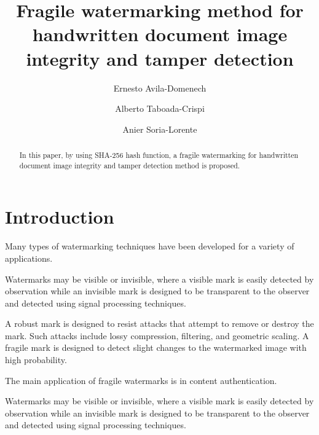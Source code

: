 \documentclass[runningheads]{llncs}
\begin{document}
%
\title{Fragile watermarking method for handwritten document image integrity and tamper detection}
%
%
\author{Ernesto Avila-Domenech \and
Alberto Taboada-Crispi \and
Anier Soria-Lorente}
%
%
%
\maketitle              %
%
\begin{abstract}
In this paper, by using SHA-256 hash function, a fragile watermarking for handwritten document image integrity and tamper detection method is proposed.

\end{abstract}
%
%
%
\section{Introduction}
Many types of watermarking techniques have been developed for a variety of applications.

Watermarks may be visible or invisible, where a visible mark is easily detected by observation while an invisible mark is designed to be transparent to the observer and detected using signal processing techniques.

A robust mark is designed to resist attacks that attempt to remove or destroy the mark. Such attacks include
lossy compression, filtering, and geometric scaling. A fragile mark is designed to detect slight changes to the watermarked image with high probability.

The main application of fragile watermarks is in content authentication.

Watermarks may be visible or invisible, where a visible mark is easily detected by observation while an invisible mark is designed to be transparent to the observer and detected using signal processing techniques.
\end{document}
